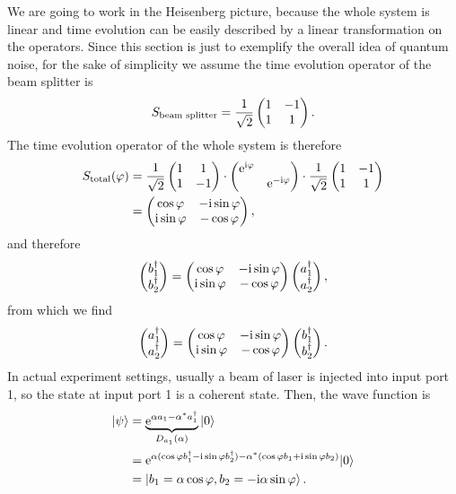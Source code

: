 \documentclass[hyperref, a4paper]{article}
\newcommand*{\ii}{\mathrm{i}}
\newcommand*{\ee}{\mathrm{e}}
\begin{document}
We are going to work in the Heisenberg picture,
because the whole system is linear 
and time evolution can be easily described by a linear transformation on the operators. 
Since this section is just to exemplify the overall idea of quantum noise,
for the sake of simplicity we assume the time evolution operator of the beam splitter is 
\begin{equation}
    S_{\text{beam splitter}} = \frac{1}{\sqrt{2}} \pmqty{ 1 & -1 \\ 1 & 1 } .
\end{equation}
The time evolution operator of the whole system is therefore
\begin{equation}
    \begin{aligned}
        S_\text{total}(\varphi) &= \frac{1}{\sqrt{2}} \pmqty{ 1 & 1 \\ 1 & -1 } \cdot \pmqty{\dmat{\ee^{\ii \varphi}, \ee^{- \ii \varphi}}} \cdot \frac{1}{\sqrt{2}} \pmqty{ 1 & -1 \\ 1 & 1 } \\
        &= \pmqty{ \cos \varphi & - \ii \sin \varphi \\ \ii \sin \varphi & - \cos \varphi },
    \end{aligned}
    \label{eq:total-matrix}
\end{equation} 
and therefore 
\begin{equation}
    \pmqty{b_1^\dagger \\ b_2^\dagger} = \pmqty{ \cos \varphi & - \ii \sin \varphi \\ \ii \sin \varphi & - \cos \varphi } \pmqty{a_1^\dagger \\ a_2^\dagger},
    \label{eq:b-def-by-a}
\end{equation}
from which we find 
\begin{equation}
    \pmqty{a_1^\dagger \\ a_2^\dagger} = \pmqty{ \cos \varphi & - \ii \sin \varphi \\ \ii \sin \varphi & - \cos \varphi } \pmqty{b_1^\dagger \\ b_2^\dagger}.
\end{equation}
In actual experiment settings,
usually a beam of laser is injected into input port 1,
so the state at input port 1 is a coherent state.
Then, the wave function is 
\begin{equation}
    \begin{aligned}
        \ket{\psi} &= \underbrace{\ee^{\alpha a_1 - \alpha^* a_1^\dagger}}_{D_{a_1}(\alpha)} \ket{0} \\
        &= \ee^{\alpha (\cos \varphi b_1^\dagger - \ii \sin \varphi b_2^\dagger) -\alpha^{*} (\cos \varphi b_1 + \ii \sin \varphi b_2)}|0\rangle \\
        &= \ket{b_1 = \alpha \cos \varphi, b_2 = - \ii \alpha \sin \varphi} .
    \end{aligned}
    \label{eq:out-state}
\end{equation}
\end{document}
